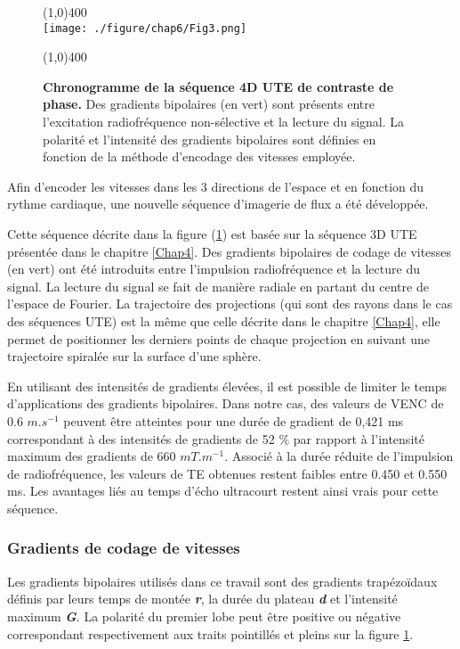 \begin{figure}[H]
\centering
\line(1,0){400} \\
\texttt{[image: ./figure/chap6/Fig3.png]}
\caption[Chronogramme de la séquence 4D UTE de contraste de phase.]{\label{fig:Chrono4DFlux}\textbf{ Chronogramme de la séquence 4D UTE de contraste de phase.} Des gradients bipolaires (en vert) sont présents entre l'excitation radiofréquence non-sélective et la lecture du signal. La polarité et l'intensité des gradients bipolaires sont définies en fonction de la méthode d'encodage des vitesses employée.}
\line(1,0){400} \\ 
\end{figure}

Afin d’encoder les vitesses dans les 3 directions de l’espace et en fonction du rythme cardiaque, une nouvelle séquence d’imagerie de flux a été développée.

Cette séquence décrite dans la figure (\ref{fig:Chrono4DFlux}) est basée sur la séquence 3D UTE présentée dans le chapitre \ref{Chap4}.  Des gradients bipolaires de codage de vitesses (en vert) ont été introduits entre l’impulsion radiofréquence et la lecture du signal. La lecture du signal se fait de manière radiale en partant du centre de l’espace de Fourier. La trajectoire des projections (qui sont des rayons dans le cas des séquences UTE)  est la même que celle décrite dans le chapitre \ref{Chap4}, elle permet de positionner les derniers points de chaque projection en suivant une trajectoire spiralée sur la surface d'une sphère.

En utilisant des intensités de gradients élevées, il est possible de limiter le temps d’applications des gradients bipolaires. Dans notre cas, des valeurs de VENC de 0.6 $m.s^{-1}$ peuvent être atteintes pour une durée de gradient de 0,421 ms correspondant à des intensités de gradients de 52 $\%$ par rapport à l'intensité maximum des gradients de 660 $mT.m^{-1}$. Associé à la durée réduite de l'impulsion de radiofréquence, les valeurs de TE obtenues restent faibles entre 0.450 et 0.550 ms. Les avantages liés au temps d'écho ultracourt restent ainsi vrais pour cette séquence.

\subsubsection{Gradients de codage de vitesses}

Les gradients bipolaires utilisés dans ce travail sont des gradients trapézoïdaux définis par leurs temps de montée \textbf{\textit{r}}, la durée du plateau \textbf{\textit{d}} et l’intensité maximum \textbf{\textit{G}}. La polarité du premier lobe peut être positive ou négative correspondant respectivement aux traits pointillés et pleins sur la figure \ref{fig:Chrono4DFlux}.

